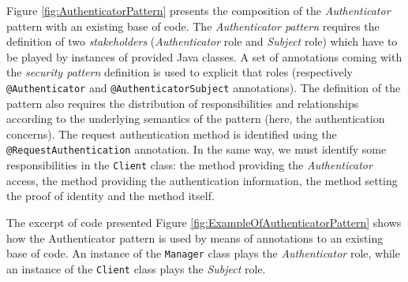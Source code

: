 Figure \ref{fig:AuthenticatorPattern} presents the composition of the \emph{Authenticator} pattern with an existing base of code. The  \emph{Authenticator pattern} requires the definition of two \emph{stakeholders} (\emph{Authenticator} role and \emph{Subject} role) which have to be played by instances of provided Java classes. A set of annotations coming with the \emph{security pattern} definition is used to explicit that roles (respectively \texttt{@Authenticator} and \texttt{@AuthenticatorSubject} annotations). The definition of the pattern also requires the distribution of responsibilities and relationships according to the underlying semantics of the pattern (here, the authentication concerns). The request authentication method is identified using the \texttt{@RequestAuthentication} annotation. In the same way, we must identify some responsibilities in the \texttt{Client} class: the method providing the  \emph{Authenticator} access, the method providing the authentication information, the method setting the proof of identity and the  method itself.



The excerpt of code presented Figure \ref{fig:ExampleOfAuthenticatorPattern} shows how the Authenticator pattern is used by means of annotations to an existing base of code. An instance of the \texttt{Manager} class plays the \emph{Authenticator} role, while an instance of the \texttt{Client} class plays the \emph{Subject} role.

